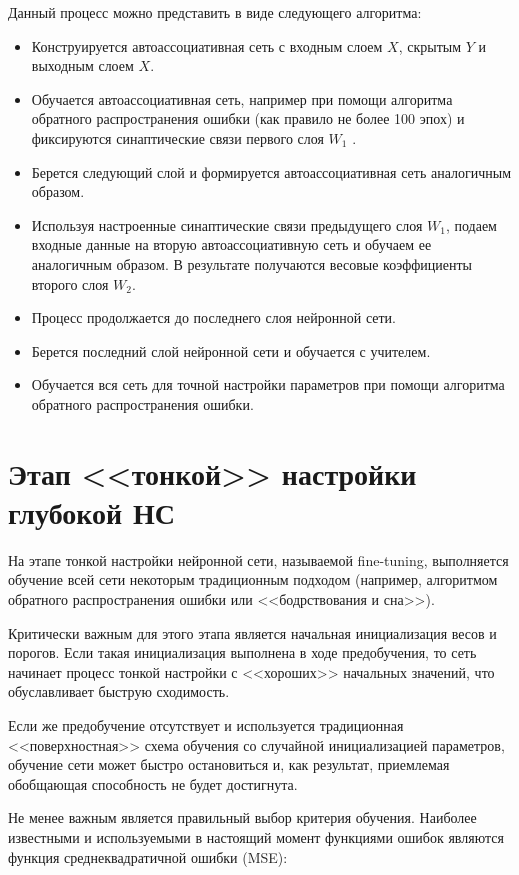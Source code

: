 Данный процесс можно представить в виде следующего алгоритма:
\begin{itemize}
	\item Конструируется автоассоциативная сеть с входным слоем $X$, скрытым $Y$ и выходным слоем $X$.
	\item Обучается автоассоциативная сеть, например при помощи алгоритма обратного распространения ошибки (как правило не более 100 эпох) и фиксируются синаптические связи первого слоя $W_1$ .
	\item Берется следующий слой и формируется автоассоциативная сеть аналогичным образом.
	\item Используя настроенные синаптические связи предыдущего слоя $W_1$, подаем входные данные на вторую автоассоциативную сеть и обучаем ее аналогичным образом. В результате получаются весовые коэффициенты второго слоя $W_2$.
	\item Процесс продолжается до последнего слоя нейронной сети.
	\item Берется последний слой нейронной сети и обучается с учителем.
	\item Обучается вся сеть для точной настройки параметров при помощи алгоритма обратного распространения ошибки.
\end{itemize}

\newpage
\section{Этап <<тонкой>> настройки глубокой НС}

На этапе тонкой настройки нейронной сети, называемой fine-tuning, выполняется обучение всей сети некоторым традиционным подходом (например, алгоритмом обратного распространения ошибки или <<бодрствования и сна>>).

Критически важным для этого этапа является начальная инициализация весов и порогов. Если такая инициализация выполнена в ходе предобучения, то сеть начинает процесс тонкой настройки с <<хороших>> начальных значений, что обуславливает быструю сходимость.

Если же предобучение отсутствует и используется традиционная <<поверхностная>> схема обучения со случайной инициализацией параметров, обучение сети может быстро остановиться и, как результат, приемлемая обобщающая способность не будет достигнута.

Не менее важным является правильный выбор критерия обучения. Наиболее известными и используемыми в настоящий момент функциями ошибок являются функция среднеквадратичной ошибки (MSE):

